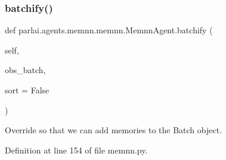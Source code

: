 \mbox{\label{classparlai_1_1agents_1_1memnn_1_1memnn_1_1MemnnAgent_a463b88b1d7fc9a7adea9802762c5968c}} 
\subsubsection{\texorpdfstring{batchify()}{batchify()}}
{\footnotesize\ttfamily def parlai.\+agents.\+memnn.\+memnn.\+Memnn\+Agent.\+batchify (\begin{DoxyParamCaption}\item[{}]{self,  }\item[{}]{obs\+\_\+batch,  }\item[{}]{sort = {\ttfamily False} }\end{DoxyParamCaption})}

\begin{DoxyVerb}Override so that we can add memories to the Batch object.
\end{DoxyVerb}
 

Definition at line 154 of file memnn.\+py.


